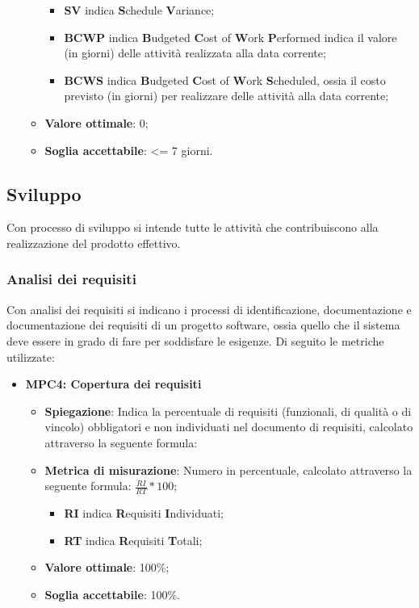 \begin{itemize}
\begin{itemize}
        \begin{itemize}
            \item \textbf{SV} indica \textbf{S}chedule \textbf{V}ariance;
            \item \textbf{BCWP} indica \textbf{B}udgeted \textbf{C}ost of \textbf{W}ork \textbf{P}erformed indica il valore (in giorni) delle attività realizzata alla data corrente;
            \item \textbf{BCWS} indica \textbf{B}udgeted \textbf{C}ost of \textbf{W}ork \textbf{S}cheduled, ossia il costo previsto (in giorni) per realizzare delle attività alla data corrente;
        \end{itemize}
        \item \textbf{Valore ottimale}: 0;
        \item \textbf{Soglia accettabile}: <= 7 giorni.
    \end{itemize}
\end{itemize}

\subsection{Sviluppo}
Con processo di sviluppo si intende tutte le attività che contribuiscono alla realizzazione del prodotto effettivo. 

\subsubsection{Analisi dei requisiti} 
Con analisi dei requisiti si indicano i processi di identificazione, documentazione e documentazione dei requisiti di un progetto software, ossia quello che il sistema deve essere in grado di fare per soddisfare le esigenze. Di seguito le metriche utilizzate:
\begin{itemize}
    \item \textbf{MPC4: Copertura dei requisiti}
    \begin{itemize}
        \item \textbf{Spiegazione}: Indica la percentuale di requisiti (funzionali, di qualità o di vincolo) obbligatori e non individuati nel documento di requisiti, calcolato attraverso la seguente formula:
        \item \textbf{Metrica di misurazione}: Numero in percentuale, calcolato attraverso la seguente formula: \textbf{$\frac{RI}{RT} * 100$};
            \begin{itemize}
                \item \textbf{RI} indica \textbf{R}equisiti \textbf{I}ndividuati;
                \item \textbf{RT} indica \textbf{R}equisiti \textbf{T}otali;
            \end{itemize}
        \item \textbf{Valore ottimale}: 100\%;
        \item \textbf{Soglia accettabile}: 100\%.
    \end{itemize}
\end{itemize}

